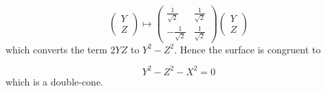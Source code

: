 \documentclass[12pt]{article}
\begin{document}
$$\left(\begin{matrix}
Y\\
Z\end{matrix}\right) \mapsto
\left(\begin{matrix}
\frac{1}{\sqrt{2}} & \frac{1}{\sqrt{2}} \\
-\frac{1}{\sqrt{2}} & \frac{1}{\sqrt{2}}\end{matrix}
\right) \left(\begin{matrix}
Y\\Z\end{matrix}\right)$$
which converts the term $2YZ$ to $Y^2 - Z^2$.  Hence the surface is
congruent to 

$$Y^2 - Z^2 - X^2 = 0$$
which is a double-cone.
\end{document}
